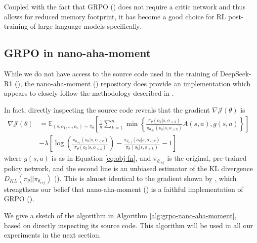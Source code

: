 \documentclass{article} %
\theoremstyle{definition}
\begin{document}
Coupled with the fact that GRPO (\cite{grpo}) does not require a critic network and thus
allows for reduced memory footprint, it has become a good choice for RL post-training of large language models specifically.

\subsection{GRPO in nano-aha-moment}
While we do not have access to the source code used in the training of DeepSeek-R1 (\cite{r1}),
the nano-aha-moment (\cite{nano-aha-moment}) repository does provide an implementation which appears to closely
follow the methodology described in \cite{r1}.

In fact, directly inspecting the source code reveals that the gradient $\nabla \mathcal{J}(\theta)$ is
\begin{equation}
    \label{eq:grpo-grad}
    \begin{array}{rl}
    \nabla \mathcal{J}(\theta) & = \mathbb{E}_{(s, o_1, \dots, o_n) \sim \pi_\theta} \left[ 
        \displaystyle
        \frac{1}{n} \sum_{k = 1}^n \min \left\{
            \frac{\pi_\theta(o_k|s, o_{< k})}{\pi_{\theta_{old}}(o_k|s, o_{< k})} A(s, a),
            g(s, a)
        \right\}
    \right] \\ 
    & {\displaystyle - \lambda \left[\log\left(\frac{\pi_{\theta_{ref}}(o_k|s, o_{< k})}{\pi_{\theta}(o_k|s, o_{< k})}\right) - \frac{\pi_{\theta_{ref}}(o_k|s, o_{< k})}{\pi_{\theta}(o_k|s, o_{< k})} - 1\right]}
    \end{array}
\end{equation}
where $g(s,a)$ is as in Equation \ref{eq:obj-fn}, and $\pi_{\theta_{ref}}$ is the original, 
pre-trained policy network, and the second line is an unbiased estimator of the KL divergence 
$D_{KL}(\pi_\theta || \pi_{\theta_{ref}})$ (\cite{kl-approx}).
This is almost identical to the gradient shown by \cite{grpo}, 
which strengthens our belief that nano-aha-moment (\cite{nano-aha-moment}) is 
a faithful implementation of GRPO (\cite{grpo}).

We give a sketch of the algorithm in Algorithm \ref{alg:grpo-nano-aha-moment}, based on directly inspecting its source code.
This algorithm will be used in all our experiments in the next section.
\end{document}
